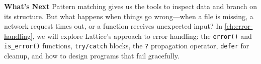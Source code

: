 
\bigskip
\noindent\textbf{What's Next}\quad
Pattern matching gives us the tools to inspect data and branch on its structure. But what happens when things go wrong---when a file is missing, a network request times out, or a function receives unexpected input? In \cref{ch:error-handling}, we will explore Lattice's approach to error handling: the \lstinline|error()| and \lstinline|is_error()| functions, \lstinline|try/catch| blocks, the \lstinline|?| propagation operator, \lstinline|defer| for cleanup, and how to design programs that fail gracefully.
